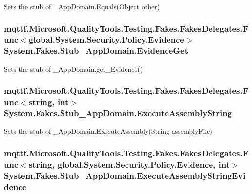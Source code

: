 Sets the stub of \-\_\-\-App\-Domain.\-Equals(\-Object other)

\hypertarget{class_system_1_1_fakes_1_1_stub___app_domain_ae0df64071d18b91ee1b7e405afcf38ab}{
\subsubsection[{Evidence\-Get}]{\setlength{\rightskip}{0pt plus 5cm}mqttf.\-Microsoft.\-Quality\-Tools.\-Testing.\-Fakes.\-Fakes\-Delegates.\-Func$<$global.\-System.\-Security.\-Policy.\-Evidence$>$ System.\-Fakes.\-Stub\-\_\-\-App\-Domain.\-Evidence\-Get}}\label{class_system_1_1_fakes_1_1_stub___app_domain_ae0df64071d18b91ee1b7e405afcf38ab}


Sets the stub of \-\_\-\-App\-Domain.\-get\-\_\-\-Evidence()

\hypertarget{class_system_1_1_fakes_1_1_stub___app_domain_a79d6d64d6de2200d55d65ead064ccc76}{
\subsubsection[{Execute\-Assembly\-String}]{\setlength{\rightskip}{0pt plus 5cm}mqttf.\-Microsoft.\-Quality\-Tools.\-Testing.\-Fakes.\-Fakes\-Delegates.\-Func$<$string, int$>$ System.\-Fakes.\-Stub\-\_\-\-App\-Domain.\-Execute\-Assembly\-String}}\label{class_system_1_1_fakes_1_1_stub___app_domain_a79d6d64d6de2200d55d65ead064ccc76}


Sets the stub of \-\_\-\-App\-Domain.\-Execute\-Assembly(\-String assembly\-File)

\hypertarget{class_system_1_1_fakes_1_1_stub___app_domain_a2dadcc02c8a03b9a9bc5916c5eef5275}{
\subsubsection[{Execute\-Assembly\-String\-Evidence}]{\setlength{\rightskip}{0pt plus 5cm}mqttf.\-Microsoft.\-Quality\-Tools.\-Testing.\-Fakes.\-Fakes\-Delegates.\-Func$<$string, global.\-System.\-Security.\-Policy.\-Evidence, int$>$ System.\-Fakes.\-Stub\-\_\-\-App\-Domain.\-Execute\-Assembly\-String\-Evidence}}\label{class_system_1_1_fakes_1_1_stub___app_domain_a2dadcc02c8a03b9a9bc5916c5eef5275}


